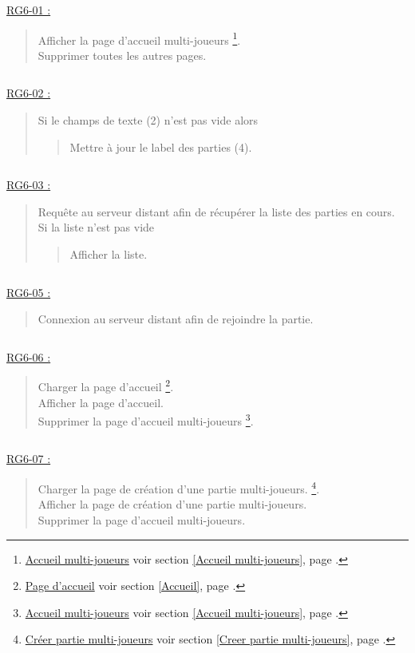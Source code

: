 \documentclass{report}
\begin{document}
			\underline{RG6-01 :}
				\begin{quote}
					Afficher la page d'accueil multi-joueurs%
					\footnote[1]{
						\hyperlink{Accueil multi-joueurs}{Accueil multi-joueurs}
						\og voir section \ref{Accueil multi-joueurs}, page \pageref{Accueil multi-joueurs}.\fg
					}.\\
					Supprimer toutes les autres pages.
				\end{quote}

			$\,$

			\underline{RG6-02 :}
				\begin{quote}
					Si le champs de texte (2) n'est pas vide alors
					\begin{quote}	
						Mettre à jour le label des parties (4).
					\end{quote}					
				\end{quote}	
		
			$\,$
				
			\underline{RG6-03 :}
				\begin{quote}
					Requête au serveur distant afin de récupérer la liste des parties en cours.\\
					Si la liste n'est pas vide
					\begin{quote}
						Afficher la liste.
					\end{quote}								
				\end{quote}

			$\,$
				
			\underline{RG6-05 :}
				\begin{quote}
					Connexion au serveur distant afin de rejoindre la partie.
				\end{quote}

			$\,$
				
			\underline{RG6-06 :}
				\begin{quote}
					Charger la page d'accueil%
						\footnote[1]{
							\hyperlink{Page d'accueil}{Page d'accueil}
							\og voir section \ref{Accueil}, page \pageref{Accueil}.\fg
						}.\\
					Afficher la page d'accueil\footnotemark[1].\\
					Supprimer la page d'accueil multi-joueurs%
						\footnote[2]{
							\hyperlink{Accueil multi-joueurs}{Accueil multi-joueurs}
							\og voir section \ref{Accueil multi-joueurs}, page \pageref{Accueil multi-joueurs}.\fg
						}.
				\end{quote}

			$\,$

			\underline{RG6-07 :}
				\begin{quote}
					Charger la page de création d'une partie multi-joueurs.%
						\footnote[3]{
							\hyperlink{Creer partie multi-joueurs}{Créer partie multi-joueurs}
							\og voir section \ref{Creer partie multi-joueurs}, page \pageref{Creer partie multi-joueurs}.\fg
						}.\\
					Afficher la page de création d'une partie multi-joueurs\footnotemark[3].\\
					Supprimer la page d'accueil multi-joueurs\footnotemark[2].
				\end{quote}
\end{document}
